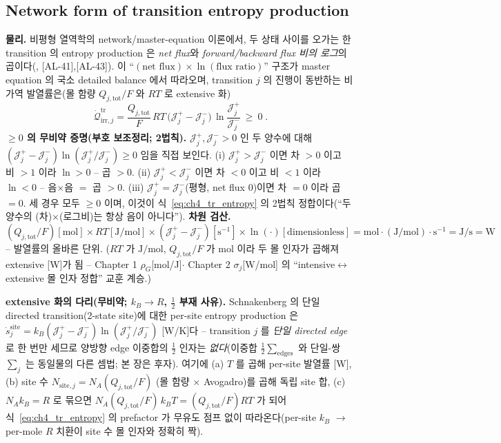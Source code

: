 \documentclass[11pt,a4paper]{article}
\newcommand{\tot}{\mathrm{tot}}
\newcommand{\irr}{\mathrm{irr}}
\newcommand{\tr}{\mathrm{tr}}
\newcommand{\AL}[1]{\textsf{[AL-#1]}}
\begin{document}
\subsection{Network form of transition entropy production}\label{sec:ch4_trep}
\textbf{물리.} 비평형 열역학의 network/master-equation 이론에서, 두 상태 사이를 오가는 한 transition 의 entropy
production 은 \emph{net flux}와 \emph{forward/backward flux 비의 로그}의 곱이다(\cite{schnakenberg1976,prigogine1967},
\AL{41},\AL{43}). 이 ``$(\text{net flux})\times\ln(\text{flux ratio})$'' 구조가 master equation 의 국소 detailed
balance 에서 따라오며, transition $j$ 의 진행이 동반하는 비가역 발열률은(몰 함량 $Q_{j,\tot}/F$ 와 $RT$ 로
extensive 화)
\begin{equation}
\boxed{\;\dot{\mathcal Q}_{\irr,j}^{\tr}=\frac{Q_{j,\tot}}{F}\,RT\,\big(\mathcal J_j^+-\mathcal J_j^-\big)\,
\ln\!\frac{\mathcal J_j^+}{\mathcal J_j^-}\ \ge\ 0\;.}
\label{eq:ch4_tr_entropy}
\end{equation}
\textbf{$\ge0$ 의 무비약 증명(부호 보조정리; 2법칙).} $\mathcal J_j^+,\mathcal J_j^->0$ 인 두 양수에 대해
$(\mathcal J_j^+-\mathcal J_j^-)\ln(\mathcal J_j^+/\mathcal J_j^-)\ge0$ 임을 직접 보인다. (i) $\mathcal J_j^+>\mathcal J_j^-$
이면 차 $>0$ 이고 비 $>1$ 이라 $\ln>0$ -- 곱 $>0$. (ii) $\mathcal J_j^+<\mathcal J_j^-$ 이면 차 $<0$ 이고 비
$<1$ 이라 $\ln<0$ -- 음$\times$음 $=$ 곱 $>0$. (iii) $\mathcal J_j^+=\mathcal J_j^-$(평형, net flux $0$)이면
차 $=0$ 이라 곱 $=0$. 세 경우 모두 $\ge0$ 이며, 이것이 식~\eqref{eq:ch4_tr_entropy} 의 2법칙 정합이다(``두
양수의 (차)$\times$(로그비)는 항상 음이 아니다''). \textbf{차원 검산.} $(Q_{j,\tot}/F)[\mathrm{mol}]\times
RT[\mathrm{J/mol}]\times(\mathcal J_j^+-\mathcal J_j^-)[\mathrm{s^{-1}}]\times\ln(\cdot)[\text{dimensionless}]
=\mathrm{mol\cdot(J/mol)\cdot s^{-1}}=\mathrm{J/s}=\mathrm W$ -- 발열률의 올바른 단위. ($RT$ 가 $\mathrm{J/mol}$,
$Q_{j,\tot}/F$ 가 $\mathrm{mol}$ 이라 두 몰 인자가 곱해져 extensive [W]가 됨 -- Chapter 1 $\rho_G$[mol/J]$\cdot$
Chapter 2 $\sigma_j$[W/mol] 의 ``intensive$\leftrightarrow$extensive 몰 인자 정합'' 교훈 계승.)

\textbf{extensive 화의 다리(무비약; $k_B\!\to\!R$, $\tfrac12$ 부재 사유).} Schnakenberg 의 단일 directed
transition(2-state site)에 대한 per-site entropy production 은 $\dot s_j^{\mathrm{site}}=k_B(\mathcal J_j^+-\mathcal J_j^-)
\ln(\mathcal J_j^+/\mathcal J_j^-)$ [W/K]다 -- transition $j$ 를 \emph{단일 directed edge} 로 한 번만 세므로 양방향
edge 이중합의 $\tfrac12$ 인자는 \emph{없다}(이중합 $\tfrac12\sum_{\text{edges}}$ 와 단일-쌍 $\sum_j$ 는 동일물의
다른 셈법; 본 장은 후자). 여기에 (a) $T$ 를 곱해 per-site 발열률 [W], (b) site 수 $N_{\mathrm{site},j}=N_A(Q_{j,\tot}/F)$
(몰 함량 $\times$ Avogadro)를 곱해 독립 site 합, (c) $N_A k_B=R$ 로 묶으면 $N_A(Q_{j,\tot}/F)\,k_B T=(Q_{j,\tot}/F)RT$
가 되어 식~\eqref{eq:ch4_tr_entropy} 의 prefactor 가 무유도 점프 없이 따라온다(per-site $k_B$ $\to$ per-mole $R$
치환이 site 수 몰 인자와 정확히 짝).
\end{document}

